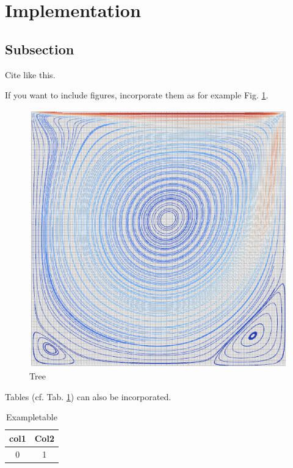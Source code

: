 \section{Implementation}



\subsection{Subsection}
Cite like this\cite{succi}.

If you want to include figures, incorporate them as for example Fig. \ref{fig:lbm}.

\begin{figure}[h!]%
 	\begin{center}%
 		\includegraphics[scale=0.5]{figure1.png}%
 		\caption{Tree}\label{fig:lbm}%
 	\end{center}%
\end{figure}

Tables (cf. Tab. \ref{tab:example}) can also be incorporated.
\begin{table}[h]%
 	\begin{center}%
		\caption{Exampletable}\label{tab:example}%
	 	\begin{tabular}{c|c}%
 			col1 & Col2\\
 			\hline
 			0 & 1\\
 		\end{tabular}%
 	\end{center}%
\end{table}

